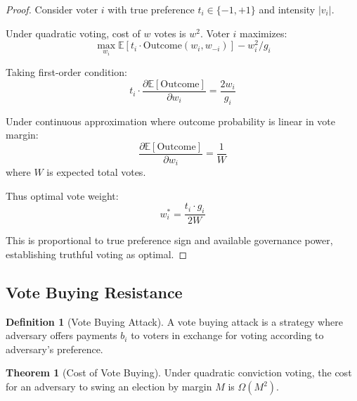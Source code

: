 \documentclass[11pt,a4paper]{article}
\theoremstyle{definition}
\newtheorem{definition}{Definition}[section]
\newtheorem{theorem}{Theorem}[section]
\theoremstyle{remark}
\begin{document}
\begin{proof}
Consider voter $i$ with true preference $t_i \in \{-1, +1\}$ and intensity $|v_i|$.

Under quadratic voting, cost of $w$ votes is $w^2$. Voter $i$ maximizes:
\begin{equation}
    \max_{w_i} \mathbb{E}[t_i \cdot \text{Outcome}(w_i, w_{-i})] - w_i^2/g_i
\end{equation}

Taking first-order condition:
\begin{equation}
    t_i \cdot \frac{\partial \mathbb{E}[\text{Outcome}]}{\partial w_i} = \frac{2w_i}{g_i}
\end{equation}

Under continuous approximation where outcome probability is linear in vote margin:
\begin{equation}
    \frac{\partial \mathbb{E}[\text{Outcome}]}{\partial w_i} = \frac{1}{W}
\end{equation}
where $W$ is expected total votes.

Thus optimal vote weight:
\begin{equation}
    w_i^* = \frac{t_i \cdot g_i}{2W}
\end{equation}

This is proportional to true preference sign and available governance power, establishing truthful voting as optimal.
\end{proof}

\subsection{Vote Buying Resistance}

\begin{definition}[Vote Buying Attack]
A vote buying attack is a strategy where adversary offers payments $b_i$ to voters in exchange for voting according to adversary's preference.
\end{definition}

\begin{theorem}[Cost of Vote Buying]
Under quadratic conviction voting, the cost for an adversary to swing an election by margin $M$ is $\Omega(M^2)$.
\end{theorem}
\end{document}
